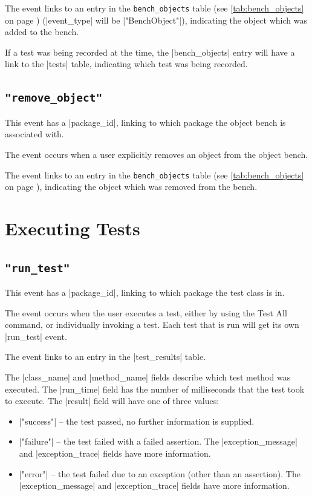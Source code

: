 \documentclass{report}
\newcommand{\myref}[1]{\autoref{#1} on page \pageref*{#1}}
\newcommand{\tabref}[1]{\lstinline|#1| table (see \myref{tab:#1})}
\begin{document}
The event links to an entry in the \tabref{bench_objects} (|event_type| will
be |"BenchObject"|), indicating
the object which was added to the bench.

If a test was being recorded at the time, the |bench_objects| entry
will have a link to the |tests| table, indicating which test was being recorded.

\subsection{\lstinline!"remove_object"!}

This event has a |package_id|, linking to which package the object
bench is associated with.

The event occurs when a user explicitly removes an object from the object bench.
  
The event links to an entry in the \tabref{bench_objects}, indicating
the object which was removed from the bench.

\section{Executing Tests}

\subsection{\lstinline!"run_test"!}

This event has a |package_id|, linking to which package the test class
is in.

The event occurs when the user executes a test, either by using the
Test All command, or individually invoking a test.  Each test that is
run will get its own |run_test| event.

The event links to an entry in the |test_results| table.


The |class_name| and |method_name| fields describe which test method was
executed.  The |run_time| field has the number of milliseconds that the test
took to execute.  The |result| field will have one of three values:

\begin{itemize}
\item |"success"| -- the test passed, no further information is supplied.
\item |"failure"| -- the test failed with a failed assertion.  The
  |exception_message| and |exception_trace| fields have more information.
\item |"error"| -- the test failed due to an exception (other than an assertion).  The
  |exception_message| and |exception_trace| fields have more information.
\end{itemize}
\end{document}

